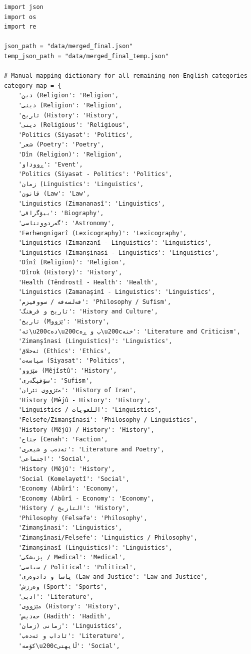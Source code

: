 \documentclass[11pt]{article}
\begin{document}
\begin{lstlisting}[style=pythoncode, caption={clean\_categories\_final.py}]
import json
import os
import re

json_path = "data/merged_final.json"
temp_json_path = "data/merged_final_temp.json"

# Manual mapping dictionary for all remaining non-English categories
category_map = {
    'دین (Religion': 'Religion',
    'دینی (Religion': 'Religion',
    'تاریخ (History': 'History',
    'دینی (Religious': 'Religious',
    'Politics (Siyasət': 'Politics',
    'شعر (Poetry': 'Poetry',
    'Dîn (Religion)': 'Religion',
    'ڕووداو': 'Event',
    'Politics (Siyasət - Politics': 'Politics',
    'زمان (Linguistics': 'Linguistics',
    'قانون (Law': 'Law',
    'Linguistics (Zimananasî': 'Linguistics',
    'بیۆگرافی': 'Biography',
    'گەردوونناسی': 'Astronomy',
    'Fərhəngnigarî (Lexicography)': 'Lexicography',
    'Linguistics (Zimanzanî - Linguistics': 'Linguistics',
    'Linguistics (Zimanşinasi - Linguistics': 'Linguistics',
    'Dînî (Religion)': 'Religion',
    'Dîrok (History)': 'History',
    'Health (Têndrostî - Health': 'Health',
    'Linguistics (Zamanaşinî - Linguistics': 'Linguistics',
    'فەلسەفە / سووفیزم': 'Philosophy / Sufism',
    'تاریخ و فرهنگ': 'History and Culture',
    'تاریخ (Mێژوو': 'History',
    'ئه\u200cده\u200cب و ڕه\u200cخنه': 'Literature and Criticism',
    'Zimanşînasi (Linguistics)': 'Linguistics',
    'ئەخلاق (Ethics': 'Ethics',
    'سیاسەت (Siyasat': 'Politics',
    'مێژوو (Mêjîstû': 'History',
    'سۆفیگەری': 'Sufism',
    'مێژووی ئێران': 'History of Iran',
    'History (Mêjû - History': 'History',
    'Linguistics / اللغويات': 'Linguistics',
    'Felsefe/Zimanşînasi': 'Philosophy / Linguistics',
    'History (Mêjû) / History': 'History',
    'جناح (Cenah': 'Faction',
    'ئەدەب و شیعری': 'Literature and Poetry',
    'اجتماعی': 'Social',
    'History (Mêjû': 'History',
    'Social (Komelayetî': 'Social',
    'Economy (Abûrî': 'Economy',
    'Economy (Abûrî - Economy': 'Economy',
    'History / التاریخ': 'History',
    'Philosophy (Felsəfə': 'Philosophy',
    'Zimanşînasi': 'Linguistics',
    'Zimanşînasi/Felsefe': 'Linguistics / Philosophy',
    'Zimanşinasî (Linguistics)': 'Linguistics',
    'پزیشکی / Medical': 'Medical',
    'سیاسی / Political': 'Political',
    'یاسا و دادوەری (Law and Justice': 'Law and Justice',
    'وەرزش (Sport': 'Sports',
    'ادبی': 'Literature',
    'مێژووی (History': 'History',
    'حەدیس (Hadith': 'Hadith',
    'زمانی (زمان': 'Linguistics',
    'ئاداب و ئەدەب': 'Literature',
    'کۆمه\u200cڵایهتی': 'Social',

\end{lstlisting}
\end{document}
